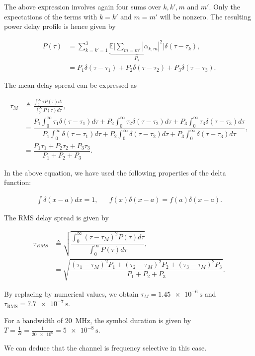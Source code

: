 \documentclass [a4paper, 11pt] {article}
\begin{document}
\begin{solution}
\begin{enumerate}
        The above expression involves again four sums over $k,k',m$ and $m'$. Only the expectations of the terms with $k=k'$ and $m=m'$ will be nonzero. The resulting power delay profile is hence given by
        
        \begin{align}
            P(\tau) &= \sum_{k =k'=1}^{3} \underbrace{\mathbb{E}\Bigg[\sum_{m = m'} | \alpha_{k,m}|^2 \Bigg]}_{P_k} \delta(\tau-\tau_{k}),\\
            &= P_1\delta(\tau-\tau_{1}) + P_2\delta(\tau-\tau_{2}) + P_3\delta(\tau-\tau_{3}).
        \end{align}
        
        The mean delay spread can be expressed as 
        
        \begin{align}
            \tau_M &\triangleq \frac{\int_0^\infty \tau P(\tau) d\tau}{\int_0^\infty P(\tau) d\tau}, \\
            &= \dfrac{P_1\int_0^\infty \tau_1 \delta(\tau-\tau_{1}) d\tau + P_2\int_0^\infty \tau_2 \delta(\tau-\tau_{2}) d\tau + P_3\int_0^\infty \tau_3 \delta(\tau-\tau_{3}) d\tau }{P_1\int_0^\infty \delta(\tau-\tau_{1}) d\tau + P_2\int_0^\infty \delta(\tau-\tau_{2}) d\tau + P_3\int_0^\infty \delta(\tau-\tau_{3}) d\tau },\\
            &= \dfrac{P_1\tau_1 + P_2\tau_2 + P_3\tau_3}{P_1+P_2+P_3}.
        \end{align}
        
        In the above equation, we have used the following properties of the delta function:
        
        \begin{align}
            \int \delta(x-a) dx = 1, &&  f(x)\delta(x-a) = f(a)\delta(x-a).
        \end{align}
        
        
        The RMS delay spread is given by 
        
        \begin{align}
        \tau_{RMS} &\triangleq \sqrt{\dfrac{\int_0^\infty (\tau - \tau_M)^2 P(\tau) d\tau}{\int_0^\infty P(\tau) d\tau}},\\
        &= \sqrt{\dfrac{(\tau_1 - \tau_M)^2P_1 + (\tau_2 - \tau_M)^2P_2 + (\tau_3 - \tau_M)^2P_3}{P_1+P_2+P_3}}.
        \end{align}
        \end{enumerate}
        
        
        By replacing by numerical values, we obtain $\tau_M = \SI{1.45e-6}{\second}$ and $\tau_{\text{RMS}} = \SI{7.7e-7}{\second}$. 
        
        For a bandwidth of \SI{20}{\mega\hertz}, the symbol duration is given by $T=\frac{1}{B} = \frac{1}{\num{20e6}} = \SI{5e-8}{\second}$. 
        
        We can deduce that the channel is frequency selective in this case.
    \end{solution}
    
\end{document}
